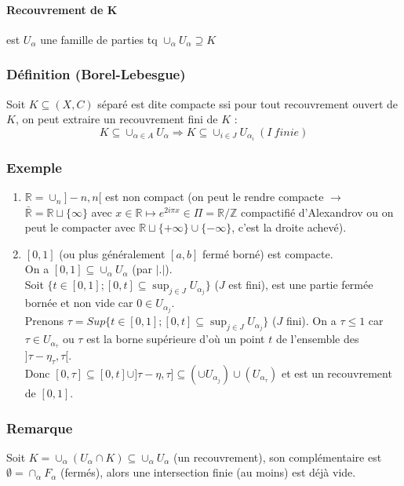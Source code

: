 \documentclass[a4paper, oneside]{report}
\newcommand{\R}{\mathbb{R}}
\newcommand{\Z}{\mathbb{Z}}
\begin{document}
\paragraph{Recouvrement de K} est $U_\alpha$ une famille de parties tq $\cup_\alpha U_\alpha \supseteq K$

\subsubsection{Définition (Borel-Lebesgue)}
Soit $K\subseteq (X,C)$ séparé est dite compacte ssi pour tout recouvrement ouvert de $K$, on peut extraire un recouvrement fini de $K$ :
$$K\subseteq \cup_{\alpha \in A}U_\alpha \Rightarrow K\subseteq \cup_{i\in J}U_{\alpha_i}~(I~finie)$$

\subsubsection{Exemple}
\begin{enumerate}
\item $\R = \cup_n ]-n,n[$ est non compact (on peut le rendre compacte $\rightarrow$ $\bar{\R}=\R\sqcup \{\infty\}$ avec $x\in\R\mapsto e^{2i\pi x}\in \Pi=\R/\Z$ compactifié d'Alexandrov ou on peut le compacter avec $\R \sqcup \{+\infty\} \cup \{-\infty\}$, c'est la droite achevé).\\
\item $[0,1]$ (ou plus généralement $[a,b]$ fermé borné) est compacte.\\
On a $[0,1]\subseteq \cup_\alpha U_\alpha$ (par $|.|$).\\
Soit $\{t \in [0,1]; [0,t]\subseteq \sup_{j\in J}U_{\alpha_j} \}$ ($J$ est fini), est une partie fermée bornée et non vide car $0\in U_{\alpha_j}$.\\
Prenons $\tau=Sup\{t\in [0,1]; [0,t]\subseteq  \sup_{j\in J}U_{\alpha_j} \}$ ($J$ fini). On a $\tau \leq 1$ car $\tau \in U_{\alpha_\tau}$ ou $\tau$ est la borne supérieure d'où un point $t$ de l'ensemble des $]\tau - \eta_\tau, \tau[$.\\
Donc $[0,\tau]\subseteq [0,t]\cup ]\tau - \eta, \tau] \subseteq (\cup U_{\alpha_j}) \cup (U_{\alpha_\tau})$ et est un recouvrement de $[0,1]$.
\end{enumerate}

\subsubsection{Remarque}
Soit $K = \cup_\alpha (U_\alpha \cap K) \subseteq \cup_\alpha U_\alpha$ (un recouvrement), son complémentaire est $\emptyset = \cap_\alpha F_\alpha$ (fermés), alors une intersection finie (au moins) est déjà vide.
\end{document}
